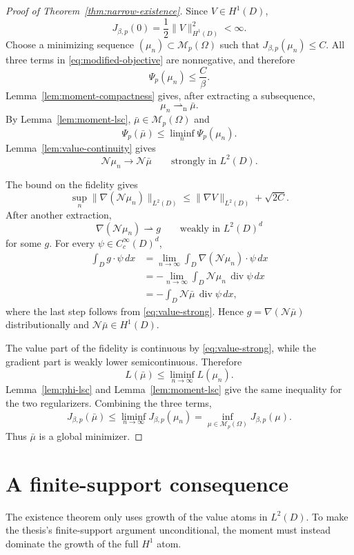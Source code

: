 \documentclass[11pt]{amsart}
\theoremstyle{definition}
\theoremstyle{remark}
\newcommand{\M}{\mathcal{M}}
\newcommand{\N}{\mathcal{N}}
\newcommand{\weakn}{\rightharpoonup_{\mathrm n}}
\begin{document}
\begin{proof}[Proof of Theorem~\ref{thm:narrow-existence}]
Since $V\in H^1(D)$,
\[
  J_{\beta,p}(0)=\frac12\|V\|_{H^1(D)}^2<\infty.
\]
Choose a minimizing sequence $(\mu_n)\subset\M_p(\Omega)$ such that
$J_{\beta,p}(\mu_n)\leq C$.  All three terms in
\eqref{eq:modified-objective} are nonnegative, and therefore
\[
  \Psi_p(\mu_n)\leq\frac{C}{\beta}.
\]
Lemma~\ref{lem:moment-compactness} gives, after extracting a subsequence,
\[
  \mu_n\weakn\bar\mu.
\]
By Lemma~\ref{lem:moment-lsc},
$\bar\mu\in\M_p(\Omega)$ and
\[
  \Psi_p(\bar\mu)
  \leq
  \liminf_n\Psi_p(\mu_n).
\]
Lemma~\ref{lem:value-continuity} gives
\begin{equation}
  \label{eq:value-strong}
  \N\mu_n\longrightarrow\N\bar\mu
  \qquad\text{strongly in }L^2(D).
\end{equation}

The bound on the fidelity gives
\[
  \sup_n\|\nabla(\N\mu_n)\|_{L^2(D)}
  \leq
  \|\nabla V\|_{L^2(D)}+\sqrt{2C}.
\]
After another extraction,
\[
  \nabla(\N\mu_n)\rightharpoonup g
  \qquad\text{weakly in }L^2(D)^d
\]
for some $g$.  For every $\psi\in C_c^\infty(D)^d$,
\begin{align*}
  \int_D g\cdot\psi\,dx
  &=
  \lim_{n\to\infty}
  \int_D\nabla(\N\mu_n)\cdot\psi\,dx\\
  &=
  -\lim_{n\to\infty}
  \int_D\N\mu_n\,\operatorname{div}\psi\,dx\\
  &=
  -\int_D\N\bar\mu\,\operatorname{div}\psi\,dx,
\end{align*}
where the last step follows from \eqref{eq:value-strong}.  Hence
$g=\nabla(\N\bar\mu)$ distributionally and
$\N\bar\mu\in H^1(D)$.

The value part of the fidelity is continuous by
\eqref{eq:value-strong}, while the gradient part is weakly lower
semicontinuous.  Therefore
\[
  L(\bar\mu)\leq\liminf_{n\to\infty}L(\mu_n).
\]
Lemma~\ref{lem:phi-lsc} and Lemma~\ref{lem:moment-lsc} give the same
inequality for the two regularizers.  Combining the three terms,
\[
  J_{\beta,p}(\bar\mu)
  \leq
  \liminf_{n\to\infty}J_{\beta,p}(\mu_n)
  =
  \inf_{\mu\in\M_p(\Omega)}J_{\beta,p}(\mu).
\]
Thus $\bar\mu$ is a global minimizer.
\end{proof}

\section{A finite-support consequence}

The existence theorem only uses growth of the value atoms in $L^2(D)$.  To
make the thesis's finite-support argument unconditional, the moment must
instead dominate the growth of the full $H^1$ atom.
\end{document}
